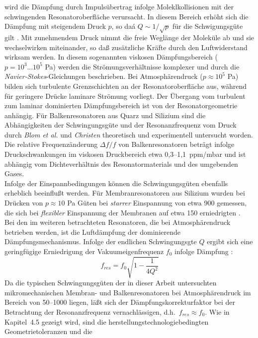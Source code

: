 wird die Dämpfung durch
Impulsübertrag infolge Moleklkollisionen mit der schwingenden
Resonatoroberfläche verursacht. In diesem Bereich erhöht sich die Dämpfung
mit steigendem Druck $p$, so daá $Q \sim 1/\sqrt{p}$ für die Schwigungsgüte
gilt \cite{Blo92}. Mit zunehmendem Druck nimmt die freie Weglänge der
Moleküle ab und sie wechselwirken miteinander, so daß zusätzliche Kräfte
durch den Luftwiderstand wirksam werden. In diesem sogenannten viskosen
Dämpfungsbereich ($p=10^3...10^5$ Pa) werden die Strömungsverhältnisse
komplexer und durch die {\sl Navier-Stokes}-Gleichungen beschrieben. Bei
Atmosphärendruck ($p \approx 10^5$ Pa) bilden sich turbulente
Grenzschichten an der Resonatoroberfläche aus, während für geringere Drücke
laminare Strömung vorliegt. Der Übergang vom turbulent zum laminar
dominierten Dämpfungsbereich ist von der Resonatorgeometrie anhängig.
Für Balkenresonatoren aus Quarz und Silizium sind die Abhängigkeiten
der Schwingungsgüte und der Resonanzfrequenz vom Druck durch
{\sl Blom et al.} \cite{Blo92} und {\sl Christen} \cite{Chr83}
theoretisch und experimentell untersucht worden. Die relative
Frequenzänderung $\Delta f / f$ von Balkenresonatoren beträgt infolge
Druckschwankungen im viskosen Druckbereich etwa 0,3--1,1~ppm/mbar
\cite{Bus94, Chr83} und ist abhängig vom Dichteverhältnis des
Resonatormaterials und des umgebenden Gases.\\
Infolge der Einspannbedingungen können die Schwingungsgüten ebenfalls
erheblich beeinflußt werden. Für Membranresonatoren aus Silizium wurden
bei Drücken von $p \approx 10$ Pa Güten bei {\em starrer} Einspannung von
etwa 900 gemessen, die sich bei {\em flexibler} Einspannung der Membranen
auf etwa 150 erniedrigten \cite{Pra91}.\\
Bei den im weiteren betrachteten Resonatoren, die bei Atmosphärendruck
betrieben werden, ist die Luftdämpfung der dominierende Dämpfungsmechanismus.
Infolge der endlichen Schwingungsgte $Q$ ergibt sich eine geringfügige
Erniedrigung der Vakuumeigenfrequenz $f_{0}$ infolge Dämpfung \cite{Pet79}:
\begin{equation}
\label{qpetersen}
 f_{res} = f_{0} \sqrt{1 - \frac{1}{4Q^{2}} }
\end{equation}
Da die typischen Schwingungsgüten der in dieser Arbeit untersuchten
mikromechanischen Membran- und Balkenresonatoren bei Atmosphärendruck
im Bereich von 50--1000 liegen, läßt sich der Dämpfungskorrekturfaktor
bei der Betrachtung der Resonanzfrequenz vernachlässigen, d.h.\
$f_{res} \approx f_{0}$.  Wie in Kapitel~4.5 gezeigt wird,
sind die herstellungstechnologiebedingten Geometrietoleranzen und die
